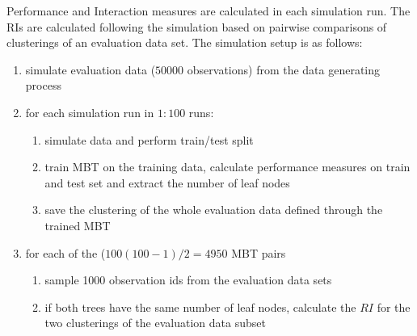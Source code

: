 Performance and Interaction measures are calculated in each simulation run.  
The RIs are calculated following the simulation based on pairwise comparisons of clusterings of an evaluation data set. The simulation setup is as follows:

\begin{enumerate}
    \item simulate evaluation data ($50000$ observations) from the data generating process
    \item for each simulation run in $1:100$ runs:
    \begin{enumerate}
        \item simulate data and perform train/test split
        \item train MBT on the training data, calculate performance measures on train and test set and extract the number of leaf nodes
        \item save the clustering of the whole evaluation data defined through the trained MBT
    \end{enumerate}
    \item for each of the ($100(100-1)/2 = 4950$ MBT pairs
    \begin{enumerate}
        \item sample 1000 observation ids from the evaluation data sets
        \item if both trees have the same number of leaf nodes, calculate the $RI$ for the two clusterings of the evaluation data subset
    \end{enumerate}
\end{enumerate}


